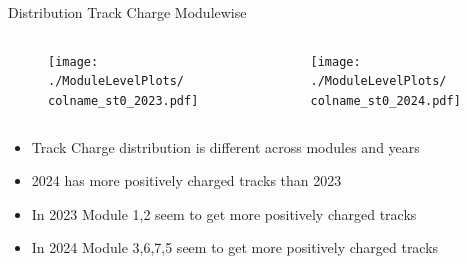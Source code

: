\begin{frame}{Distribution Track Charge Modulewise}
    \newcommand{\colname}{Track_charge}
    \begin{columns}
        \begin{column}{0.6\linewidth}
            \begin{figure}
                \centering
                \texttt{[image: ./ModuleLevelPlots/\\colname\_st0\_2023.pdf]}
            \end{figure}
        \end{column}
        \begin{column}{0.6\linewidth}
            \begin{figure}
                \centering
                \texttt{[image: ./ModuleLevelPlots/\\colname\_st0\_2024.pdf]}
            \end{figure}
        \end{column}
    \end{columns}

    \begin{itemize}
        \small
        \item Track Charge distribution is different across modules and years
        \item 2024 has more positively charged tracks than 2023 
        \item In 2023 Module 1,2 seem to get more positively charged tracks
        \item In 2024 Module 3,6,7,5 seem to get more positively charged tracks
    \end{itemize}
\end{frame}
    

